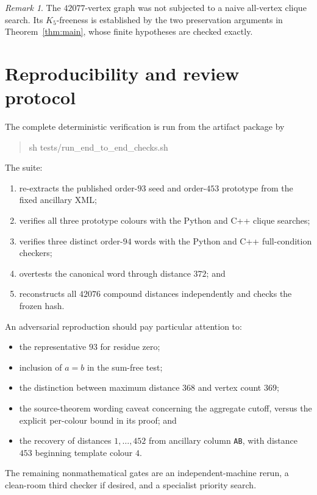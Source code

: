 \documentclass[11pt]{article}
\theoremstyle{definition}
\theoremstyle{remark}
\newtheorem{remark}[theorem]{Remark}
\newcommand{\code}[1]{\texttt{#1}}
\begin{document}
\begin{remark}
The $42077$-vertex graph was not subjected to a naive all-vertex clique
search.  Its $K_5$-freeness is established by the two preservation arguments
in Theorem~\ref{thm:main}, whose finite hypotheses are checked exactly.
\end{remark}

\section{Reproducibility and review protocol}
\label{sec:repro}

The complete deterministic verification is run from the artifact package by
\begin{quote}
\ttfamily\small
sh tests/run\_end\_to\_end\_checks.sh
\end{quote}
The suite:
\begin{enumerate}
  \item re-extracts the published order-$93$ seed and order-$453$ prototype
  from the fixed ancillary XML;
  \item verifies all three prototype colours with the Python and C++
  clique searches;
  \item verifies three distinct order-$94$ words with the Python and C++
  full-condition checkers;
  \item overtests the canonical word through distance $372$; and
  \item reconstructs all $42076$ compound distances independently and
  checks the frozen hash.
\end{enumerate}

An adversarial reproduction should pay particular attention to:
\begin{itemize}
  \item the representative $93$ for residue zero;
  \item inclusion of $a=b$ in the sum-free test;
  \item the distinction between maximum distance $368$ and vertex count
  $369$;
  \item the source-theorem wording caveat concerning the aggregate cutoff,
  versus the explicit per-colour bound in its proof; and
  \item the recovery of distances $1,\ldots,452$ from ancillary column
  \code{AB}, with distance $453$ beginning template colour $4$.
\end{itemize}

The remaining nonmathematical gates are an independent-machine rerun, a
clean-room third checker if desired, and a specialist priority search.
\end{document}
